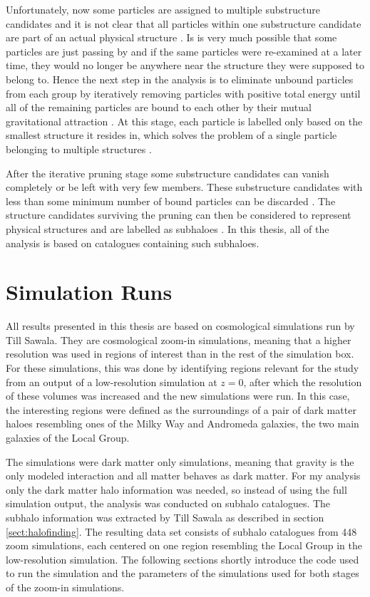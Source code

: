 \documentclass[english, twoside]{HYgradu}
\begin{document}
Unfortunately, now some particles are assigned to multiple substructure candidates and it is not clear that all particles within one substructure candidate are part of an actual physical structure \citep{springel2001populating}. Is is very much possible that some particles are just passing by and if the same particles were re-examined at a later time, they would no longer be anywhere near the structure they were supposed to belong to. Hence the next step in the analysis is to eliminate unbound particles from each group by iteratively removing particles with positive total energy until all of the remaining particles are bound to each other by their mutual gravitational attraction \citep{springel2001populating}. At this stage, each particle is labelled only based on the smallest structure it resides in, which solves the problem of a single particle belonging to multiple structures \citep{springel2001populating}.

After the iterative pruning stage some substructure candidates can vanish completely or be left with very few members. These substructure candidates with less than some minimum number of bound particles can be discarded \citep{springel2001populating}. The structure candidates surviving the pruning can then be considered to represent physical structures and are labelled as subhaloes \citep{springel2001populating}. In this thesis, all of the analysis is based on catalogues containing such subhaloes. 

\section{Simulation Runs} \label{sect:simruns}
All results presented in this thesis are based on cosmological simulations run by Till Sawala. They are cosmological zoom-in simulations, meaning that a higher resolution was used in regions of interest than in the rest of the simulation box. For these simulations, this was done by identifying regions relevant for the study from an output of a low-resolution simulation at $z=0$, after which the resolution of these volumes was increased and the new simulations were run. In this case, the interesting regions were defined as the surroundings of a pair of dark matter haloes resembling ones of the Milky Way and Andromeda galaxies, the two main galaxies of the Local Group.

The simulations were dark matter only simulations, meaning that gravity is the only modeled interaction and all matter behaves as dark matter. For my analysis only the dark matter halo information was needed, so instead of using the full simulation output, the analysis was conducted on subhalo catalogues. The subhalo information was extracted by Till Sawala as described in section \ref{sect:halofinding}. The resulting data set consists of subhalo catalogues from 448 zoom simulations, each centered on one region resembling the Local Group in the low-resolution simulation. The following sections shortly introduce the code used to run the simulation and the parameters of the simulations used for both stages of the zoom-in simulations.
\end{document}
